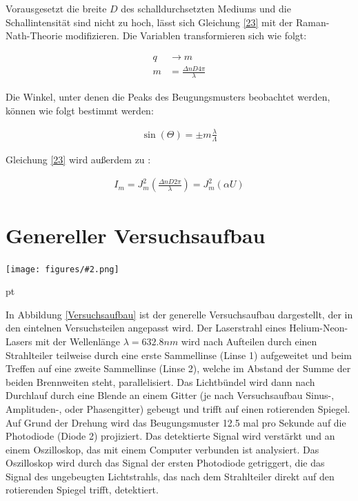 \documentclass[12pt]{article}
\newcommand{\gra}[3][0.7]{
	\begin{minipage}[h!]{\textwidth}
		\centering
		\texttt{[image: figures/\#2.png]}
		\captionof{figure}{#3}
	\end{minipage}
	\vskip 30 pt
}
\begin{document}
Vorausgesetzt die breite $D$ des schalldurchsetzten Mediums und die Schallintensität sind nicht zu hoch, lässt sich Gleichung \ref{23} mit der Raman-Nath-Theorie modifizieren. Die Variablen transformieren sich wie folgt:

\begin{align}
q &\rightarrow m\\
m &= \frac{\Delta n D 4 \pi}{\lambda}
\end{align}

Die Winkel, unter denen die Peaks des Beugungsmusters beobachtet werden, können wie folgt bestimmt werden:

\begin{align}
\sin\left( \Theta\right) = \pm m \frac{\lambda}{\Lambda}
\end{align}

Gleichung \ref{23} wird außerdem zu \cite{rana}:

\begin{align}
I_m = J_m^2 \left( \frac{\Delta n D 2 \pi}{\lambda} \right) = J_m^2\left(\alpha U \right) 
\end{align}
\newpage
\section{Genereller Versuchsaufbau} \label{Aufbau}

\gra[1]{Versuchsaufbau}{Versuchsaufbau \label{Versuchsaufbau} \cite{anleitung}}

In Abbildung \ref{Versuchsaufbau} ist der generelle Versuchsaufbau dargestellt, der in den eintelnen Versuchsteilen angepasst wird.
Der Laserstrahl eines Helium-Neon-Lasers mit der Wellenlänge $\lambda = 632.8 nm$ wird nach Aufteilen durch einen Strahlteiler  teilweise durch eine erste Sammellinse (Linse 1) aufgeweitet und beim Treffen auf eine zweite Sammellinse (Linse 2), welche im Abstand der Summe der beiden Brennweiten steht, parallelisiert. Das Lichtbündel wird dann nach Durchlauf durch eine Blende an einem Gitter (je nach Versuchsaufbau Sinus-, Amplituden-, oder Phasengitter) gebeugt und trifft auf einen rotierenden Spiegel. Auf Grund der Drehung wird das Beugungsmuster 12.5 mal pro Sekunde auf die Photodiode (Diode 2) projiziert. Das detektierte Signal wird verstärkt und an einem Oszilloskop, das mit einem Computer verbunden ist analysiert. Das Oszilloskop wird durch das Signal der ersten Photodiode getriggert, die das Signal des ungebeugten Lichtstrahls, das nach dem Strahlteiler direkt auf den rotierenden Spiegel trifft, detektiert.
\end{document}
